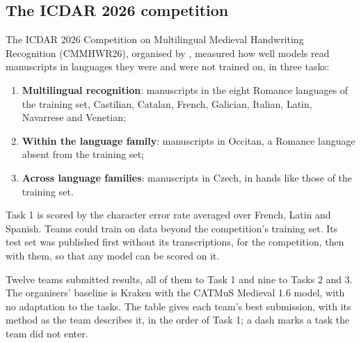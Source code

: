 \subsection{The ICDAR 2026 competition}
The ICDAR 2026 Competition on Multilingual Medieval Handwriting Recognition (CMMHWR26), organised by
, measured how well models read manuscripts in languages they were and
were not trained on, in three tasks:
\begin{enumerate}
  \item \textbf{Multilingual recognition}: manuscripts in the eight Romance languages of the training set, Castilian,
    Catalan, French, Galician, Italian, Latin, Navarrese and Venetian;
  \item \textbf{Within the language family}: manuscripts in Occitan, a Romance language absent from the training set;
  \item \textbf{Across language families}: manuscripts in Czech, in hands like those of the training set.
\end{enumerate}
Task 1 is scored by the character error rate averaged over French, Latin and Spanish. Teams could train on data
beyond the competition's training set. Its test set was published first without its transcriptions, for the
competition, then with them, so that any model can be scored on it.

Twelve teams submitted results, all of them to Task 1 and nine to Tasks 2 and 3. The organisers' baseline is Kraken
with the CATMuS Medieval 1.6 model, with no adaptation to the tasks. The table gives each team's best submission, with
its method as the team describes it, in the order of Task 1; a dash marks a task the team did not enter.

